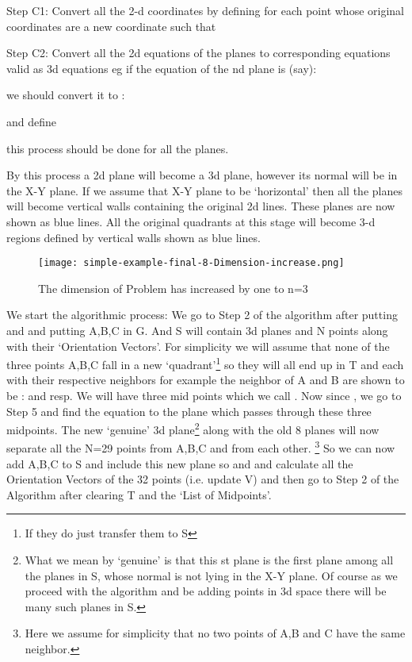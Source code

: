 \documentclass[english]{article}
\begin{document}
Step C1: Convert all the 2-d coordinates by defining for each point whose original coordinates are    a new coordinate     such that 



Step C2: Convert all the 2d equations of the  planes to corresponding equations valid as 3d equations eg if the equation of the nd plane is (say):


we should convert it to : 

and define 

 this process should be done for all the  planes.

By this process a 2d plane will become a 3d plane, however its normal will be in the X-Y plane. If we assume that X-Y plane to be `horizontal' then all the planes will become vertical walls containing the original 2d lines. These planes are now shown as blue lines. All the original quadrants at this stage will become 3-d regions defined by vertical walls shown as blue lines. 

\medskip{}
\begin{figure}[htp]
 \begin{center}
\texttt{[image: simple-example-final-8-Dimension-increase.png]}

\caption{The dimension of Problem has increased by one to n=3}

\label{fig:fig-k} \end{center}
\end{figure} 

We start the algorithmic process: We go to Step 2 of the algorithm after putting  and  and putting A,B,C in G. And S will contain  3d planes and N points along with their `Orientation Vectors'. For simplicity we will assume that none of the three points A,B,C fall in a new `quadrant'\footnote{If they do just transfer them to S} so they will all end up in T and each with their respective neighbors for example the neighbor of A and B are shown to be :  and  resp. We will have three mid points which we call . Now since , we go to Step 5 and find the equation to the plane which passes through these three midpoints. The new `genuine' 3d plane\footnote{What we mean by `genuine' is that this st plane is the first plane among all the planes in S, whose normal is not lying in the X-Y plane.  Of course as we proceed with the algorithm and be adding points in 3d space there will be many such planes in S.}   along with the old 8 planes will now separate all the N=29 points from A,B,C and from each other. \footnote{Here we assume for simplicity that no two points of A,B and C have the same neighbor.} So we can now add A,B,C to S and include this new plane so   and  and calculate all the Orientation Vectors of the 32 points (i.e. update V) and then go to Step 2 of the Algorithm after clearing T and the `List of Midpoints'.
\end{document}
